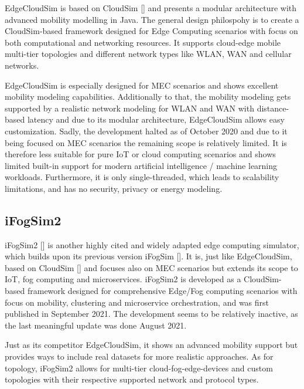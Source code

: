EdgeCloudSim is based on CloudSim [\cite{sim-base-cloudsim}] and presents a modular architecture with advanced mobility modelling in Java.
The general design philospohy is to create a CloudSim-based framework designed for Edge Computing scenarios with focus on both computational and networking resources.
It supports cloud-edge mobile multi-tier topologies and different network types like WLAN, WAN and cellular networks.

EdgeCloudSim is especially designed for MEC scenarios and shows excellent mobility modeling capabilities.
Additionally to that, the mobility modeling gets supported by a realistic network modeling for WLAN and WAN with distance-based latency and due to its modular architecture, EdgeCloudSim allows easy customization.
Sadly, the development halted as of October 2020 and due to it being focused on MEC scenarios the remaining scope is relatively limited.
It is therefore less suitable for pure IoT or cloud computing scenarios and shows limited built-in support for modern artificial intelligence / machine learning workloads.
Furthermore, it is only single-threaded, which leads to scalability limitations, and has no security, privacy or energy modeling.

\subsection{iFogSim2}
iFogSim2 [\cite{sim-ifogsim2}] is another highly cited and widely adapted edge computing simulator, which builds upon its previous version iFogSim [\cite{sim-base-ifogsim1}].
It is, just like EdgeCloudSim, based on CloudSim [\cite{sim-base-cloudsim}] and focuses also on MEC scenarios but extends its scope to IoT, fog computing and microservices.
iFogSim2 is developed as a CloudSim-based framework designed for comprehensive Edge/Fog computing scenarios with focus on mobility, clustering and microservice orchestration, and was first published in September 2021.
The development seems to be relatively inactive, as the last meaningful update was done August 2021.

Just as its competitor EdgeCloudSim, it shows an advanced mobility support but provides ways to include real datasets for more realistic approaches.
As for topology, iFogSim2 allows for multi-tier cloud-fog-edge-devices and custom topologies with their respective supported network and protocol types.

